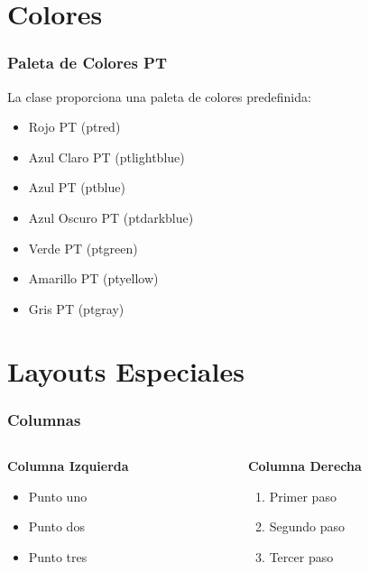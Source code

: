 \documentclass{pt-slides}
\begin{document}
\section{Colores}

\begin{frame}
    \frametitle{Paleta de Colores PT}

    La clase proporciona una paleta de colores predefinida:

    \begin{itemize}
        \item \textcolor{ptred}{Rojo PT (ptred)}
        \item \textcolor{ptlightblue}{Azul Claro PT (ptlightblue)}
        \item \textcolor{ptblue}{Azul PT (ptblue)}
        \item \textcolor{ptdarkblue}{Azul Oscuro PT (ptdarkblue)}
        \item \textcolor{ptgreen}{Verde PT (ptgreen)}
        \item \textcolor{ptyellow}{Amarillo PT (ptyellow)}
        \item \textcolor{ptgray}{Gris PT (ptgray)}
    \end{itemize}
\end{frame}

\section{Layouts Especiales}

\begin{frame}
    \frametitle{Columnas}

    \begin{columns}
        \begin{column}{0.48\textwidth}
            \textbf{Columna Izquierda}
            \begin{itemize}
                \item Punto uno
                \item Punto dos
                \item Punto tres
            \end{itemize}
        \end{column}
        \begin{column}{0.48\textwidth}
            \textbf{Columna Derecha}
            \begin{enumerate}
                \item Primer paso
                \item Segundo paso
                \item Tercer paso
            \end{enumerate}
        \end{column}
    \end{columns}
\end{frame}
\end{document}
